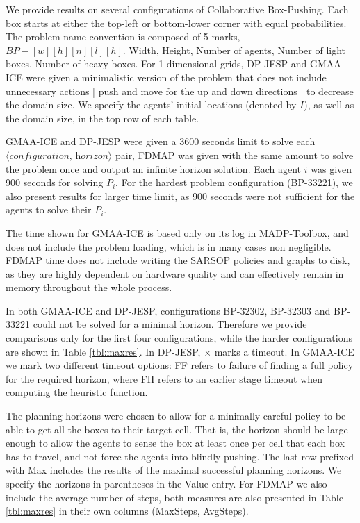 \documentclass[letterpaper]{article} %
\theoremstyle{definition}
\newcommand{\cbp}[0]{Collaborative Box-Pushing}
\begin{document}
We provide results on several configurations of \cbp. Each box starts at either the top-left or bottom-lower corner with equal probabilities. The problem name convention is composed of 5 marks, $\textit{BP}-[w][h][n][l][h]$.
Width, Height, Number of agents, Number of light boxes, Number of heavy boxes. For 1 dimensional grids, DP-JESP and GMAA-ICE were given a minimalistic version of the problem that does not include unnecessary actions | push and move for the up and down directions | to decrease the domain size. We specify the agents' initial locations (denoted by $I$), as well as the domain size, in the top row of each table.

GMAA-ICE and DP-JESP were given a 3600 seconds limit to solve each $\langle\textit{configuration, horizon}\rangle$ pair, FDMAP was given with the same amount to solve the problem once and output an infinite horizon solution. Each agent $i$ was given 900 seconds for  solving $P_i$. For the hardest problem configuration (BP-33221), we also present results for larger time limit, as 900 seconds were not sufficient for the agents to solve their $P_i$.

The time shown for GMAA-ICE is based only on its log in MADP-Toolbox, and does not include the problem loading, which is in many cases non negligible. FDMAP time does not include writing the SARSOP policies and graphs to disk, as they are highly dependent on hardware quality and can effectively remain in memory throughout the whole process.

In both GMAA-ICE and DP-JESP, configurations BP-32302, BP-32303 and BP-33221 could not be solved for a minimal horizon. Therefore we provide comparisons only for the first four configurations, while the harder configurations are shown in Table \ref{tbl:maxres}.
In DP-JESP, $\times$ marks a timeout. In GMAA-ICE we mark two different timeout options: FF refers to failure of finding a full policy for the required horizon, where FH refers to an earlier stage timeout when computing the heuristic function.

The planning horizons were chosen to allow for a minimally careful policy to be able to get all the boxes to their target cell. That is, the horizon should be large enough to allow the agents to sense the box at least once per cell that each box has to travel, and not force the agents into blindly pushing.
The last row prefixed with Max includes the results of the maximal successful planning horizons. We specify the horizons in parentheses in the Value entry. For FDMAP we also include the average number of steps, both measures are also presented in Table \ref{tbl:maxres} in their own columns (MaxSteps, AvgSteps).
\end{document}
